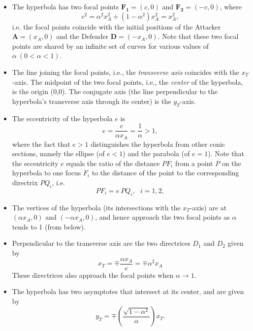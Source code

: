 \begin{itemize}
\item The hyperbola has two focal points $\boldsymbol{F_1}=(c,0)$ and $\boldsymbol{F_2}=(-c,0)$, where 
\begin{equation}
c^2= \alpha^2 x_A^2 + (1-\alpha^2)x_A^2=x_A^2,
\end{equation}
i.e. the focal points coincide with the initial positions of the Attacker $\boldsymbol{A}=(x_A,0)$ and the Defender $\boldsymbol{D}=(-x_A,0).$ Note that these two focal points are shared by an infinite set of curves for various values of $\alpha\ (0<\alpha<1)$. 
\item The line joining the  focal points, i.e., the \textit{transverse axis} coincides with the $x_T$-axis. The midpoint of the two focal points, i.e., the \textit{center} of the hyperbola, is the origin (0,0). The conjugate axis (the line perpendicular to the hyperbola's transverse axis through its center) is the $y_T$-axis.
\item The eccentricity of the hyperbola $e$ is
\begin{equation}
e=\dfrac{c}{\alpha x_A}=\dfrac{1}{\alpha}>1,
\end{equation}
where the fact that $e>1$ distinguishes the hyperbola from other conic sections, namely the ellipse (of $e<1$) and the parabola (of $e=1$). Note that the eccentricity $e$ equals the ratio of the distance $PF_i$ from a point $P$ on the hyperbola to one focus $F_i$ to the distance of the point to the corresponding directrix $PQ_i$, i.e.
\begin{equation}
PF_i = e\ PQ_i , \ \ \ i=1,2,
\end{equation}
\item The vertices of the hyperbola (its intersections with the $x_T$-axis) are at $(\alpha x_A,0)$ and $(-\alpha x_A,0)$, and hence approach the two focal points as $\alpha$ tends to 1 (from below).
\item Perpendicular to the transverse axis are the two directrices $D_1$ and $D_2$ given by
\begin{equation}
x_T = \mp \dfrac{\alpha x_A}{e} = \mp \alpha^2 x_A
\end{equation}
These directrices also approach the focal points when $\alpha\to1$.
\item The hyperbola has two asymptotes that intersect at its center, and are given by
\begin{equation}
y_T= \mp (\dfrac{\sqrt{1-\alpha^2}}{\alpha})x_T.
\end{equation}

\end{itemize}
